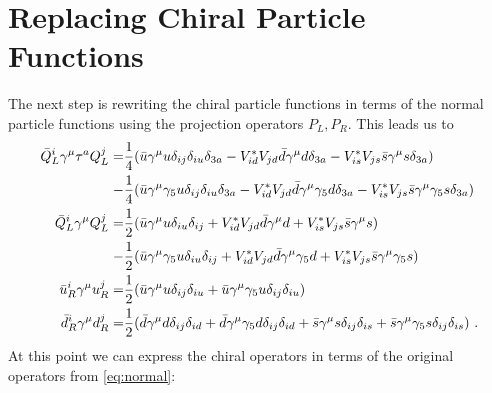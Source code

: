 \section{Replacing Chiral Particle Functions}
The next step is rewriting the chiral particle functions in terms of the normal particle functions using the projection operators $P_L,P_R$. This leads us to
\begin{align}
	\bar{Q}_L^i\gamma^\mu\tau^a Q_L^j =&\frac{1}{4}(\bar{u}\gamma^\mu u\delta_{ij}\delta_{iu}\delta_{3a}
	- V_{id}^*V_{jd}\bar{d}\gamma^\mu d\delta_{3a} - V_{is}^*V_{js}\bar{s}\gamma^\mu s\delta_{3a})\notag \\
	-&\frac{1}{4} (\bar{u}\gamma^\mu \gamma_5u\delta_{ij}\delta_{iu}\delta_{3a} - V_{id}^*V_{jd}\bar{d}\gamma^\mu\gamma_5 d\delta_{3a} - V_{is}^*V_{js}\bar{s}\gamma^\mu\gamma_5 s\delta_{3a})\notag \\
	\bar{Q}_L^i\gamma^\mu Q_L^j =&\frac{1}{2}(
	\bar{u}\gamma^\mu u\delta_{iu}\delta_{ij} + V_{id}^*V_{jd}\bar{d}\gamma^\mu d
	+ V_{is}^*V_{js}\bar{s}\gamma^\mu s)\notag \\
	-&\frac{1}{2}(\bar{u}\gamma^\mu\gamma_5u\delta_{iu}\delta_{ij} + V_{id}^*V_{jd}\bar{d}\gamma^\mu\gamma_5d + V_{is}^*V_{js}\bar{s}\gamma^\mu\gamma_5s)\notag \\
	\bar{u}_R^i\gamma^\mu u_R^j =&\frac{1}{2}(\bar{u}\gamma^\mu u\delta_{ij}\delta_{iu} + \bar{u}\gamma^\mu \gamma_5u\delta_{ij}\delta_{iu})\notag \\
	\bar{d}_R^i\gamma^\mu d_R^j =&\frac{1}{2}(\bar{d}\gamma^\mu d\delta_{ij}\delta_{id} + \bar{d}\gamma^\mu\gamma_5d\delta_{ij}\delta_{id} + \bar{s}\gamma^\mu s\delta_{ij}\delta_{is} + \bar{s}\gamma^\mu \gamma_5s\delta_{ij}\delta_{is}) \ .
\end{align}
At this point we can express the chiral operators in terms of the original operators from \eqref{eq:normal}:
